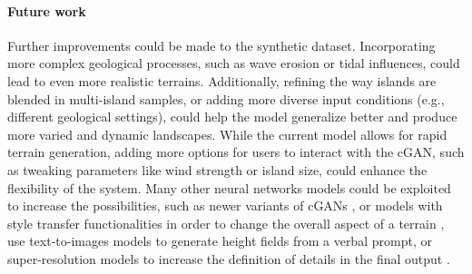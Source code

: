\documentclass{egpubl}
\begin{document}
\paragraph{Future work}
Further improvements could be made to the synthetic dataset. Incorporating more complex geological processes, such as wave erosion or tidal influences, could lead to even more realistic terrains. Additionally, refining the way islands are blended in multi-island samples, or adding more diverse input conditions (e.g., different geological settings), could help the model generalize better and produce more varied and dynamic landscapes.  While the current model allows for rapid terrain generation, adding more options for users to interact with the cGAN, such as tweaking parameters like wind strength or island size, could enhance the flexibility of the system. 
Many other neural networks models could be exploited to increase the possibilities, such as newer variants of cGANs \cite{Park2019}, or models with style transfer functionalities \cite{Gatys2015,Zhu2020} in order to change the overall aspect of a terrain \cite{Perche2023a,Perche2023b}, use text-to-images models \cite{Rombach2021,Radford2021} to generate height fields from a verbal prompt, or super-resolution models \cite{Dong2014} to increase the definition of details in the final output \cite{Guerin2016a}.







\end{document}
